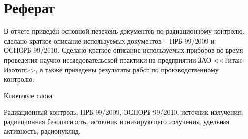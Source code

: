 \chapter*{Реферат}
	В отчёте приведён основной перечень документов по радиационному контролю, 
	сделано краткое описание используемых документов -- НРБ-99/2009 и 
	ОСПОРБ-99/2010. Сделано краткое описание используемых приборов во время 
	проведения научно-исследовательской практики на предприятии ЗАО 
	<<Титан-Изотоп>>, а также приведены результаты работ по производственному 
	контролю.

\begin{center}
	Ключевые слова \\
\end{center}

	Радиационный контроль, НРБ-99/2009, ОСПОРБ-99/2010, источник излучения, 
	радиационная безопасность, источник ионизирующего излучения, 
	удельная активность, радионуклид.
	
\thispagestyle{empty}
\clearpage